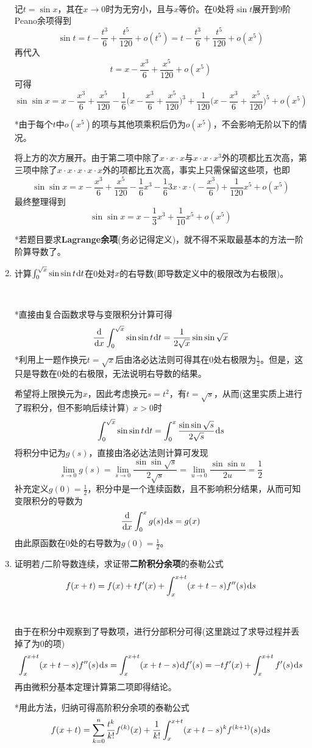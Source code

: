 \documentclass[a4paper,UTF8,fontset=windows]{ctexart}
\newcommand*{\dr}{\hspace{0.07em}\mathrm{d}}
\begin{document}
\begin{enumerate}
    \

    记$t=\sin x$，其在$x\to0$时为无穷小，且与$x$等价。在0处将$\sin t$展开到9阶Peano余项得到
    $$\sin t=t-\frac{t^3}{6}+\frac{t^5}{120}+o(t^5)=t-\frac{t^3}{6}+\frac{t^5}{120}+o(x^5)$$
    再代入
    $$t=x-\frac{x^3}{6}+\frac{x^5}{120}+o(x^5)$$
    可得
    $$\sin\sin x=x-\frac{x^3}{6}+\frac{x^5}{120}-\frac{1}{6}\bigg(x-\frac{x^3}{6}+\frac{x^5}{120}\bigg)^3+\frac{1}{120}\bigg(x-\frac{x^3}{6}+\frac{x^5}{120}\bigg)^5+o(x^5)$$

    *由于每个$t$中$o(x^5)$的项与其他项乘积后仍为$o(x^5)$，不会影响无阶以下的情况。

    将上方的次方展开。由于第二项中除了$x\cdot x\cdot x$与$x\cdot x\cdot x^3$外的项都比五次高，第三项中除了$x\cdot x\cdot x\cdot x\cdot x$外的项都比五次高，事实上只需保留这些项，也即
    $$\sin\sin x=x-\frac{x^3}{6}+\frac{x^5}{120}-\frac{1}{6}x^3-\frac{1}{6}3x\cdot x\cdot\bigg(-\frac{x^3}{6}\bigg)+\frac{1}{120}x^5+o(x^5)$$
    最终整理得到
    $$\sin\sin x=x-\frac{1}{3}x^3+\frac{1}{10}x^5+o(x^5)$$

    *若题目要求\textbf{Lagrange余项}(务必记得定义)，就不得不采取最基本的方法一阶阶算导数了。

    \item 计算$\int_0^{\sqrt{x}}\sin\sin t\dr t$在0处对$x$的右导数(即导数定义中的极限改为右极限)。
    
    \

    *直接由复合函数求导与变限积分计算可得
    $$\frac{\dr}{\dr x}\int_{0}^{\sqrt{x}}\sin\sin t\dr t=\frac{1}{2\sqrt x}\sin\sin\sqrt x$$
    *利用上一题作换元$t=\sqrt x$后由洛必达法则可得其在0处右极限为$\frac{1}{2}$。但是，这只是导数在0处的右极限，无法说明右导数的结果。
    
    希望将上限换元为$x$，因此考虑换元$s=t^2$，有$t=\sqrt s$，从而(这里实质上进行了瑕积分，但不影响后续计算)\ $x>0$时
    $$\int_0^{\sqrt{x}}\sin\sin t\dr t=\int_0^x\frac{\sin\sin\sqrt s}{2\sqrt s}\dr s$$
    将积分中记为$g(s)$，直接由洛必达法则计算可发现
    $$\lim_{s\to0}g(s)=\lim_{s\to 0}\frac{\sin\sin\sqrt s}{2\sqrt s}=\lim_{u\to 0}\frac{\sin\sin u}{2 u}=\frac{1}{2}$$
    补充定义$g(0)=\frac{1}{2}$，积分中是一个连续函数，且不影响积分结果，从而可知变限积分的导数为
    $$\frac{\dr}{\dr x}\int_0^xg(s)\dr s=g(x)$$
    由此原函数在0处的右导数为$g(0)=\frac{1}{2}$。

    \item 证明若$f$二阶导数连续，求证带\textbf{二阶积分余项}的泰勒公式
    $$f(x+t)=f(x)+tf'(x)+\int_x^{x+t}(x+t-s)f''(s)\dr s$$

    \

    由于在积分中观察到了导数项，进行分部积分可得(这里跳过了求导过程并丢掉了为0的项)
    $$\int_x^{x+t}(x+t-s)f''(s)\dr s=\int_x^{x+t}(x+t-s)\dr f'(s)=-tf'(x)+\int_x^{x+t}f'(s)\dr s$$
    再由微积分基本定理计算第二项即得结论。

    *用此方法，归纳可得高阶积分余项的泰勒公式
    $$f(x+t)=\sum_{k=0}^n\frac{t^k}{k!}f^{(k)}(x)+\frac{1}{k!}\int_x^{x+t}(x+t-s)^kf^{(k+1)}(s)\dr s$$
\end{enumerate}
\end{document}
